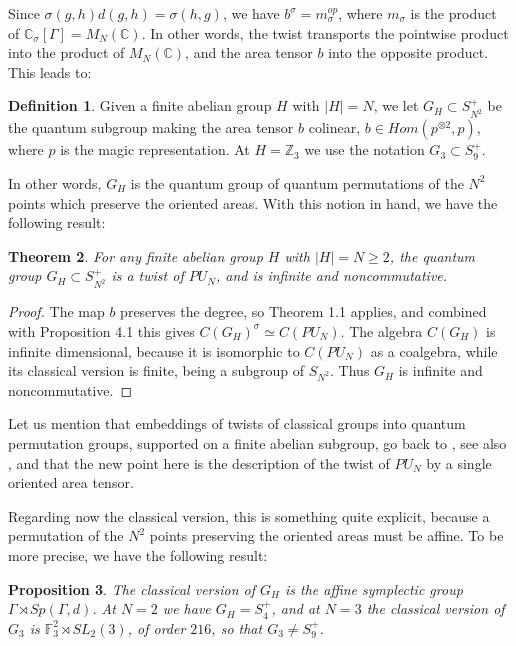 \documentclass[11pt]{amsart}
\newtheorem{theorem}{Theorem}[section]
\newtheorem{proposition}[theorem]{Proposition}
\theoremstyle{definition}
\newtheorem{definition}[theorem]{Definition}
\begin{document}
Since $\sigma(g,h)d(g,h)=\sigma(h,g)$, we have $b^\sigma=m_\sigma^{op}$, where $m_\sigma$ is the product of $\mathbb C_\sigma[\Gamma]=M_N(\mathbb C)$. In other words, the twist transports the pointwise product into the product of $M_N(\mathbb C)$, and the area tensor $b$ into the opposite product. This leads to:

\begin{definition}
Given a finite abelian group $H$ with $|H|=N$, we let $G_H\subset S_{N^2}^+$ be the quantum subgroup making the area tensor $b$ colinear, $b\in Hom(p^{\otimes2},p)$, where $p$ is the magic representation. At $H=\mathbb Z_3$ we use the notation $G_3\subset S_9^+$.
\end{definition}

In other words, $G_H$ is the quantum group of quantum permutations of the $N^2$ points which preserve the oriented areas. With this notion in hand, we have the following result:

\begin{theorem}
For any finite abelian group $H$ with $|H|=N\geq2$, the quantum group $G_H\subset S_{N^2}^+$ is a twist of $PU_N$, and is infinite and noncommutative.
\end{theorem}

\begin{proof}
The map $b$ preserves the degree, so Theorem 1.1 applies, and combined with Proposition 4.1 this gives $C(G_H)^\sigma\simeq C(PU_N)$. The algebra $C(G_H)$ is infinite dimensional, because it is isomorphic to $C(PU_N)$ as a coalgebra, while its classical version is finite, being a subgroup of $S_{N^2}$. Thus $G_H$ is infinite and noncommutative.
\end{proof}

Let us mention that embeddings of twists of classical groups into quantum permutation groups, supported on a finite abelian subgroup, go back to \cite[Theorem 8.3]{bbn}, see also \cite{cte}, and that the new point here is the description of the twist of $PU_N$ by a single oriented area tensor.

Regarding now the classical version, this is something quite explicit, because a permutation of the $N^2$ points preserving the oriented areas must be affine. To be more precise, we have the following result:

\begin{proposition}
The classical version of $G_H$ is the affine symplectic group $\Gamma\rtimes Sp(\Gamma,d)$. At $N=2$ we have $G_H=S_4^+$, and at $N=3$ the classical version of $G_3$ is $\mathbb F_3^2\rtimes SL_2(3)$, of order $216$, so that $G_3\neq S_9^+$.
\end{proposition}
\end{document}
